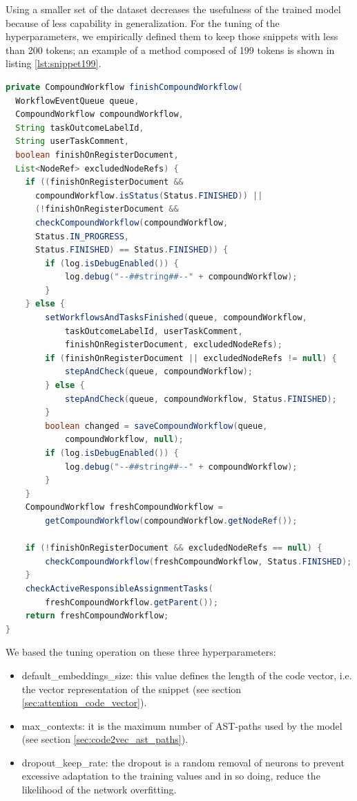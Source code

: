 Using a smaller set of the dataset decreases the usefulness of the trained model because of less capability in generalization.
For the tuning of the hyperparameters, we empirically defined them to keep those snippets with less than 200 tokens; an example of a method composed of 199 tokens is shown in listing \ref{lst:snippet199}.

\begin{lstlisting}[caption={Code snippet with 199 tokens}, label={lst:snippet199},language=Java]
private CompoundWorkflow finishCompoundWorkflow(
  WorkflowEventQueue queue,
  CompoundWorkflow compoundWorkflow, 
  String taskOutcomeLabelId, 
  String userTaskComment, 
  boolean finishOnRegisterDocument, 
  List<NodeRef> excludedNodeRefs) {
    if ((finishOnRegisterDocument &&
      compoundWorkflow.isStatus(Status.FINISHED)) ||
      (!finishOnRegisterDocument &&
      checkCompoundWorkflow(compoundWorkflow,
      Status.IN_PROGRESS, 
      Status.FINISHED) == Status.FINISHED)) {
        if (log.isDebugEnabled()) {
            log.debug("--##string##--" + compoundWorkflow);
        }
    } else {
        setWorkflowsAndTasksFinished(queue, compoundWorkflow, 
            taskOutcomeLabelId, userTaskComment,
            finishOnRegisterDocument, excludedNodeRefs);
        if (finishOnRegisterDocument || excludedNodeRefs != null) {
            stepAndCheck(queue, compoundWorkflow);
        } else {
            stepAndCheck(queue, compoundWorkflow, Status.FINISHED);
        }
        boolean changed = saveCompoundWorkflow(queue,
            compoundWorkflow, null);
        if (log.isDebugEnabled()) {
            log.debug("--##string##--" + compoundWorkflow);
        }
    }
    CompoundWorkflow freshCompoundWorkflow =
        getCompoundWorkflow(compoundWorkflow.getNodeRef());
        
    if (!finishOnRegisterDocument && excludedNodeRefs == null) {
        checkCompoundWorkflow(freshCompoundWorkflow, Status.FINISHED);
    }
    checkActiveResponsibleAssignmentTasks(
        freshCompoundWorkflow.getParent());
    return freshCompoundWorkflow;
}
\end{lstlisting}

\noindent We based the tuning operation on these three hyperparameters:
\begin{itemize}
    \item default\_embeddings\_size: this value defines the length of the code vector, i.e. the vector representation of the snippet (see section \ref{sec:attention_code_vector}).
    \item max\_contexts: it is the maximum number of AST-paths used by the model (see section \ref{sec:code2vec_ast_paths}).
    \item dropout\_keep\_rate: the dropout is a random removal of neurons to prevent excessive adaptation to the training values and in so doing, reduce the likelihood of the network overfitting.
\end{itemize}

